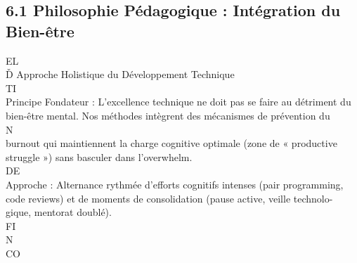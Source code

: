 \documentclass[12pt,landscape,a4paper]{article}
\begin{document}
\subsection{6.1 Philosophie Pédagogique : Intégration du Bien-être}
\vspace{0.5em}
\vspace{0.5em}
\vspace{0.5em}
\vspace{0.5em}
EL\\
Ď Approche Holistique du Développement Technique\\
\vspace{0.5em}
\vspace{0.5em}
\vspace{0.5em}
\vspace{0.5em}
TI\\
Principe Fondateur : L’excellence technique ne doit pas se faire au détriment du bien-être mental. Nos méthodes intègrent des mécanismes de prévention du\\
\vspace{0.5em}
\vspace{0.5em}
\vspace{0.5em}
\vspace{0.5em}
N\\
burnout qui maintiennent la charge cognitive optimale (zone de « productive struggle ») sans basculer dans l’overwhelm.\\
\vspace{0.5em}
\vspace{0.5em}
\vspace{0.5em}
\vspace{0.5em}
DE\\
Approche : Alternance rythmée d’efforts cognitifs intenses (pair programming, code reviews) et de moments de consolidation (pause active, veille technolo-\\
gique, mentorat doublé).\\
\vspace{0.5em}
\vspace{0.5em}
\vspace{0.5em}
\vspace{0.5em}
FI\\
N\\
CO\\
\end{document}
